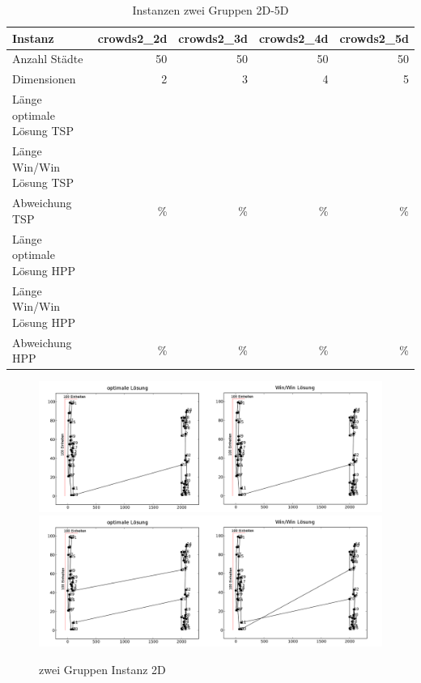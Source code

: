 \documentclass[11pt,a4paper]{article}
\begin{document}
\begin{table}[H]
        \centering
        \begin{tabular}{| l | r | r | r | r |}
            \hline
            Instanz                     & \textbf{crowds2\_2d}     
                                        & \textbf{crowds2\_3d}     
                                        & \textbf{crowds2\_4d}     
                                        & \textbf{crowds2\_5d}             \\ \hline
                Anzahl Städte               & 50        & 50       & 50         & 50        \\ \hline
                Dimensionen                 & 2         & 3        & 4          & 5         \\ \hline
                Länge optimale Lösung TSP   &           &          &            &           \\ \hline
                Länge Win/Win Lösung  TSP   &           &          &            &           \\ \hline
                Abweichung TSP              &     \%    &      \%  &      \%    &      \%   \\ \hline
                Länge optimale Lösung HPP   &           &          &            &           \\ \hline
                Länge Win/Win Lösung  HPP   &           &          &            &           \\ \hline
                Abweichung HPP              &     \%    &     \%   &     \%     &      \%   \\ \hline
        \end{tabular}
        \caption{Instanzen zwei Gruppen 2D-5D}
        \label{tab:instanzen_crowds2}
\end{table}

\begin{figure}[H]
    \centering
    \includegraphics[width=16cm]{gfx/crowds2_hpp_comparison}
    \includegraphics[width=16cm]{gfx/crowds2_tsp_comparison}
    \caption{zwei Gruppen Instanz 2D}
    \label{img:crowds2_comparison}
\end{figure}
\end{document}

